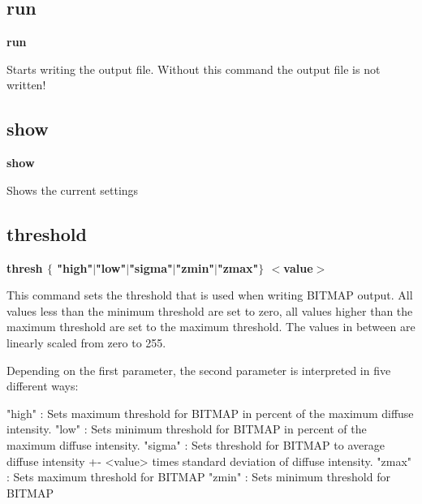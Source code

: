 \subsection*{run}
{\bf run \par }
\par
\vspace{3pt}
Starts writing the output file. Without this command the output file 
is not written! 
\subsection*{show}
{\bf show \par }
\par
\vspace{3pt}
Shows the current settings 
\subsection*{threshold}
{\bf thresh $ \{$ "high"$| $"low"$| $"sigma"$| $"zmin"$| $"zmax"$\} $ $ <$value$> $ \par }
\par
\vspace{3pt}
This command sets the threshold that is used when writing BITMAP output. 
All values less than the minimum threshold are set to zero, 
all values higher than the maximum threshold are set to the 
maximum threshold. The values in between are linearly scaled from zero 
to 255. 
\par
Depending on the first parameter, the second parameter is interpreted in 
five different ways: 
\par
\begin{MacVerbatim}
"high"  : Sets maximum threshold for BITMAP in percent of the maximum
          diffuse intensity.
"low"   : Sets minimum threshold for BITMAP in percent of the maximum
          diffuse intensity.
"sigma" : Sets threshold for BITMAP to average diffuse intensity
          +- <value> times standard deviation of diffuse intensity.
"zmax"  : Sets maximum threshold for BITMAP
"zmin"  : Sets minimum threshold for BITMAP
\end{MacVerbatim}
